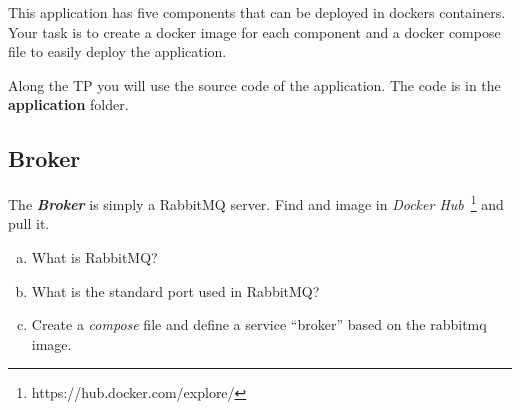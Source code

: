 \documentclass[a4paper,11pt]{exam}
\begin{document}
This application has five components that can be deployed in dockers containers.
Your task is to create a docker image for each component and a docker compose file to easily deploy the application.

Along the TP you will use the source code of the application. The code is in the \textbf{application} folder.

\subsection{Broker}

\begin{questions}
	\question The \textit{\textbf{Broker}} is simply a RabbitMQ server. Find and image in \textit{Docker Hub}~\footnote{https://hub.docker.com/explore/} and pull it.
	\begin{enumerate}[(a)]
		\item What is RabbitMQ?
		\item What is the standard port used in RabbitMQ?
		\item Create a \textit{compose} file and define a service ``broker'' based on the rabbitmq image.
	\end{enumerate}
\end{questions}
\end{document}
